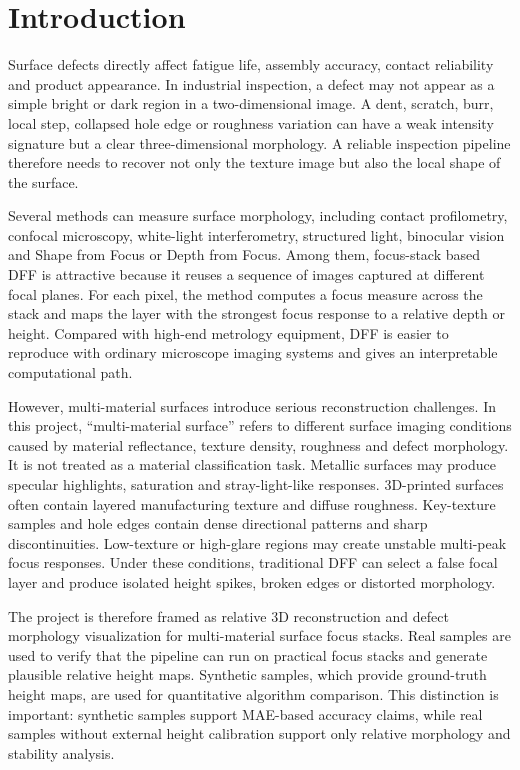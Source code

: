 \documentclass[11pt,a4paper]{article}
\begin{document}
\section{Introduction}

Surface defects directly affect fatigue life, assembly accuracy, contact reliability and product appearance. In industrial inspection, a defect may not appear as a simple bright or dark region in a two-dimensional image. A dent, scratch, burr, local step, collapsed hole edge or roughness variation can have a weak intensity signature but a clear three-dimensional morphology. A reliable inspection pipeline therefore needs to recover not only the texture image but also the local shape of the surface.

Several methods can measure surface morphology, including contact profilometry, confocal microscopy, white-light interferometry, structured light, binocular vision and Shape from Focus or Depth from Focus. Among them, focus-stack based DFF is attractive because it reuses a sequence of images captured at different focal planes. For each pixel, the method computes a focus measure across the stack and maps the layer with the strongest focus response to a relative depth or height. Compared with high-end metrology equipment, DFF is easier to reproduce with ordinary microscope imaging systems and gives an interpretable computational path.

However, multi-material surfaces introduce serious reconstruction challenges. In this project, ``multi-material surface'' refers to different surface imaging conditions caused by material reflectance, texture density, roughness and defect morphology. It is not treated as a material classification task. Metallic surfaces may produce specular highlights, saturation and stray-light-like responses. 3D-printed surfaces often contain layered manufacturing texture and diffuse roughness. Key-texture samples and hole edges contain dense directional patterns and sharp discontinuities. Low-texture or high-glare regions may create unstable multi-peak focus responses. Under these conditions, traditional DFF can select a false focal layer and produce isolated height spikes, broken edges or distorted morphology.

The project is therefore framed as relative 3D reconstruction and defect morphology visualization for multi-material surface focus stacks. Real samples are used to verify that the pipeline can run on practical focus stacks and generate plausible relative height maps. Synthetic samples, which provide ground-truth height maps, are used for quantitative algorithm comparison. This distinction is important: synthetic samples support MAE-based accuracy claims, while real samples without external height calibration support only relative morphology and stability analysis.
\end{document}
